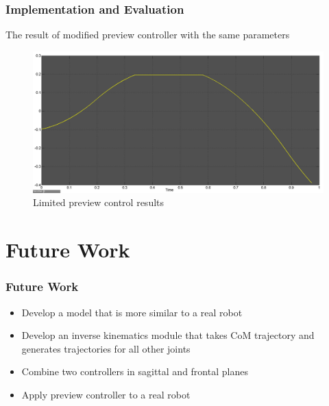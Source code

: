 \documentclass{beamer}
\begin{document}

	\begin{frame}
		\frametitle{Implementation and Evaluation}
		The result of modified preview controller with the same parameters
		
		\begin{figure}[h!]
			\centering
			\includegraphics[width=0.8\linewidth]{presentation_images/30}
			\caption{Limited preview control results}
		\end{figure}
	\end{frame}
	

	\section*{Future Work}
	\begin{frame}
		\frametitle{Future Work}
		\begin{itemize}
			\item
				Develop a model that is more similar to a real robot
			\item
				Develop an inverse kinematics module that takes CoM trajectory and generates trajectories for all other joints
			\item
				Combine two controllers in sagittal and frontal planes
			\item
				Apply preview controller to a real robot
		\end{itemize}
	\end{frame}
	
\end{document}
